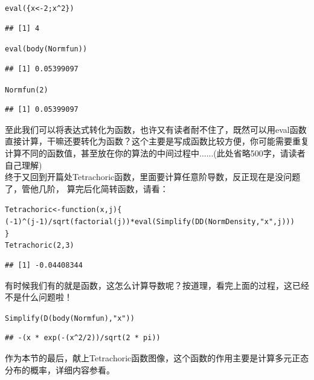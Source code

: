 \documentclass[a4paper]{ctexart}\usepackage[]{graphicx}\usepackage[]{color}
\makeatletter
\newcommand{\hlnum}[1]{\textcolor[rgb]{0.502,0.086,1}{#1}}%
\newcommand{\hlstr}[1]{\textcolor[rgb]{1,0.4,0.2}{#1}}%
\newcommand{\hlopt}[1]{\textcolor[rgb]{0.251,0.251,0.251}{#1}}%
\newcommand{\hlstd}[1]{\textcolor[rgb]{0.251,0.251,0.251}{#1}}%
\newcommand{\hlkwa}[1]{\textcolor[rgb]{0.941,0.188,0.816}{#1}}%
\newcommand{\hlkwb}[1]{\textcolor[rgb]{0,0.439,0.902}{#1}}%
\newcommand{\hlkwc}[1]{\textcolor[rgb]{0.188,0.941,0.314}{#1}}%
\newcommand{\hlkwd}[1]{\textcolor[rgb]{0.69,0.188,0.941}{#1}}%
\newenvironment{kframe}{%
 \def\at@end@of@kframe{}%
 \ifinner\ifhmode%
  \def\at@end@of@kframe{\end{minipage}}%
  \begin{minipage}{\columnwidth}%
 \fi\fi%
 \def\FrameCommand##1{\hskip\@totalleftmargin \hskip-\fboxsep
 \colorbox{shadecolor}{##1}\hskip-\fboxsep
     \hskip-\linewidth \hskip-\@totalleftmargin \hskip\columnwidth}%
 \MakeFramed {\advance\hsize-\width
   \@totalleftmargin\z@ \linewidth\hsize
   \@setminipage}}%
 {\par\unskip\endMakeFramed%
 \at@end@of@kframe}
\newenvironment{knitrout}{}{} %
\makeatother
\begin{document}
\begin{knitrout}
\color{fgcolor}\begin{kframe}
\begin{alltt}
\hlkwd{eval}\hlstd{(\{x}\hlkwb{<-}\hlnum{2}\hlstd{;x}\hlopt{^}\hlnum{2}\hlstd{\})}
\end{alltt}
\begin{verbatim}
## [1] 4
\end{verbatim}
\begin{alltt}
\hlkwd{eval}\hlstd{(}\hlkwd{body}\hlstd{(Normfun))}
\end{alltt}
\begin{verbatim}
## [1] 0.05399097
\end{verbatim}
\begin{alltt}
\hlkwd{Normfun}\hlstd{(}\hlnum{2}\hlstd{)}
\end{alltt}
\begin{verbatim}
## [1] 0.05399097
\end{verbatim}
\end{kframe}
\end{knitrout}
至此我们可以将表达式转化为函数，也许又有读者耐不住了，既然可以用eval函数直接计算，干嘛还要转化为函数？这个主要是写成函数比较方便，你可能需要重复计算不同的函数值，甚至放在你的算法的中间过程中......(此处省略500字，请读者自己理解)\\
终于又回到开篇处Tetrachoric函数，里面要计算任意阶导数，反正现在是没问题了，管他几阶，
算完后化简转函数，请看：
\begin{knitrout}
\color{fgcolor}\begin{kframe}
\begin{alltt}
\hlstd{Tetrachoric}\hlkwb{<-}\hlkwa{function}\hlstd{(}\hlkwc{x}\hlstd{,}\hlkwc{j}\hlstd{)\{}
  \hlstd{(}\hlopt{-}\hlnum{1}\hlstd{)}\hlopt{^}\hlstd{(j}\hlopt{-}\hlnum{1}\hlstd{)}\hlopt{/}\hlkwd{sqrt}\hlstd{(}\hlkwd{factorial}\hlstd{(j))}\hlopt{*}\hlkwd{eval}\hlstd{(}\hlkwd{Simplify}\hlstd{(}\hlkwd{DD}\hlstd{(NormDensity,}\hlstr{"x"}\hlstd{,j)))}
\hlstd{\}}
\hlkwd{Tetrachoric}\hlstd{(}\hlnum{2}\hlstd{,}\hlnum{3}\hlstd{)}
\end{alltt}
\begin{verbatim}
## [1] -0.04408344
\end{verbatim}
\end{kframe}
\end{knitrout}
有时候我们有的就是函数，这怎么计算导数呢？按道理，看完上面的过程，这已经不是什么问题啦！
\begin{knitrout}
\color{fgcolor}\begin{kframe}
\begin{alltt}
\hlkwd{Simplify}\hlstd{(}\hlkwd{D}\hlstd{(}\hlkwd{body}\hlstd{(Normfun),}\hlstr{"x"}\hlstd{))}
\end{alltt}
\begin{verbatim}
## -(x * exp(-(x^2/2))/sqrt(2 * pi))
\end{verbatim}
\end{kframe}
\end{knitrout}
作为本节的最后，献上Tetrachoric函数图像，这个函数的作用主要是计算多元正态分布的概率，详细内容参看\cite{Harris1980The}。
\end{document}
